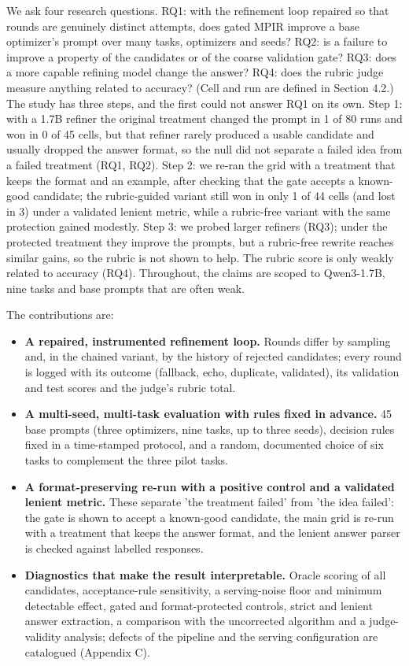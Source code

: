 \documentclass{ieeeaccess}
\begin{document}
We ask four research questions. RQ1: with the refinement loop repaired so that rounds are genuinely distinct attempts, does gated MPIR improve a base optimizer's prompt over many tasks, optimizers and seeds? RQ2: is a failure to improve a property of the candidates or of the coarse validation gate? RQ3: does a more capable refining model change the answer? RQ4: does the rubric judge measure anything related to accuracy? (Cell and run are defined in Section 4.2.) The study has three steps, and the first could not answer RQ1 on its own. Step 1: with a 1.7B refiner the original treatment changed the prompt in 1 of 80 runs and won in 0 of 45 cells, but that refiner rarely produced a usable candidate and usually dropped the answer format, so the null did not separate a failed idea from a failed treatment (RQ1, RQ2). Step 2: we re-ran the grid with a treatment that keeps the format and an example, after checking that the gate accepts a known-good candidate; the rubric-guided variant still won in only 1 of 44 cells (and lost in 3) under a validated lenient metric, while a rubric-free variant with the same protection gained modestly. Step 3: we probed larger refiners (RQ3); under the protected treatment they improve the prompts, but a rubric-free rewrite reaches similar gains, so the rubric is not shown to help. The rubric score is only weakly related to accuracy (RQ4). Throughout, the claims are scoped to Qwen3-1.7B, nine tasks and base prompts that are often weak.

The contributions are:

\begin{itemize}
\item \textbf{A repaired, instrumented refinement loop.} Rounds differ by sampling and, in the chained variant, by the history of rejected candidates; every round is logged with its outcome (fallback, echo, duplicate, validated), its validation and test scores and the judge's rubric total.
\item \textbf{A multi-seed, multi-task evaluation with rules fixed in advance.} 45 base prompts (three optimizers, nine tasks, up to three seeds), decision rules fixed in a time-stamped protocol, and a random, documented choice of six tasks to complement the three pilot tasks.
\item \textbf{A format-preserving re-run with a positive control and a validated lenient metric.} These separate 'the treatment failed' from 'the idea failed': the gate is shown to accept a known-good candidate, the main grid is re-run with a treatment that keeps the answer format, and the lenient answer parser is checked against labelled responses.
\item \textbf{Diagnostics that make the result interpretable.} Oracle scoring of all candidates, acceptance-rule sensitivity, a serving-noise floor and minimum detectable effect, gated and format-protected controls, strict and lenient answer extraction, a comparison with the uncorrected algorithm and a judge-validity analysis; defects of the pipeline and the serving configuration are catalogued (Appendix C).
\end{itemize}
\end{document}
